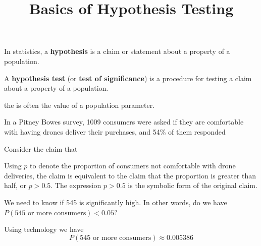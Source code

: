 \documentclass{beamer}
\title[MA205 - Section 8.1]{Basics of Hypothesis Testing}
\newcommand{\prob}[1]{P\left(#1\right)}
\begin{document}
\begin{frame}
\titlepage
\end{frame}

\begin{frame}
\begin{definition}
In statistics, a \textbf{hypothesis} is a claim or statement about a property of a population.
\end{definition}\pause

\begin{definition}
A \textbf{hypothesis test} (or \textbf{test of significance}) is a procedure for testing a claim about a property of a population.
\end{definition}\pause

\begin{note}
the  is often the value of a population parameter.
\end{note}
\end{frame}

\begin{frame}
\begin{example}\label{exp_drones}
In a Pitney Bowes survey, 1009 consumers were asked if they are comfortable with having drones deliver their purchases, and 54\% of them responded \pause

\vspace{2mm}
Consider the claim that \pause

\vspace{2mm}
Using $p$ to denote the proportion of consumers not comfortable with drone deliveries, the  claim is equivalent to the claim that the proportion is greater than half, or $p>0.5$. The expression $p>0.5$ is the symbolic form of the original claim.\pause

\vspace{2mm}
We need to know if 545 is significantly high. In other words, do we have $\prob{\text{545 or more consumers}}<0.05$?\pause

\vspace{2mm}
Using technology we have 
\begin{equation*}
\prob{\text{545 or more consumers}}\approx0.005386
\end{equation*}
\end{example}
\end{frame}
\end{document}

